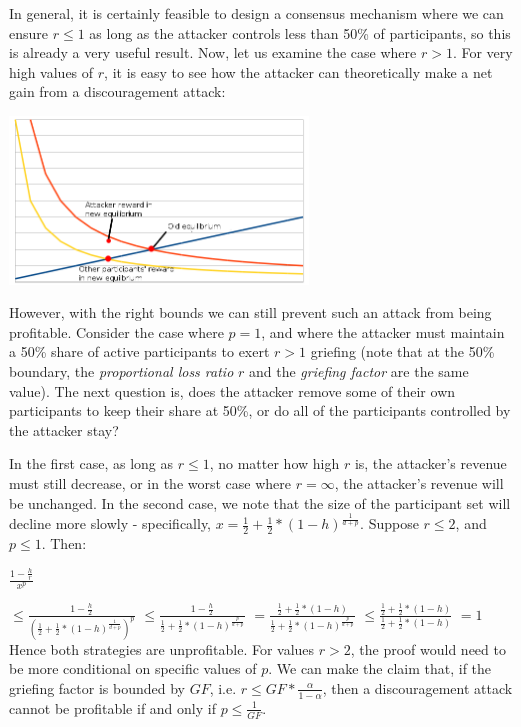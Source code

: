 \documentclass[12pt]{article}
\begin{document}
In general, it is certainly feasible to design a consensus mechanism where we can ensure $r \le 1$ as long as the attacker controls less than 50\% of participants, so this is already a very useful result. Now, let us examine the case where $r > 1$. For very high values of $r$, it is easy to see how the attacker can theoretically make a net gain from a discouragement attack:

\includegraphics[width=300px]{disc_chart3.png}



However, with the right bounds we can still prevent such an attack from being profitable. Consider the case where $p=1$, and where the attacker must maintain a 50\% share of active participants to exert $r > 1$ griefing (note that at the 50\% boundary, the \textit{proportional loss ratio} $r$ and the \textit{griefing factor} are the same value). The next question is, does the attacker remove some of their own participants to keep their share at 50\%, or do all of the participants controlled by the attacker stay?

In the first case, as long as $r \le 1$, no matter how high $r$ is, the attacker's revenue must still decrease, or in the worst case where $r = \infty$, the attacker's revenue will be unchanged. In the second case, we note that the size of the participant set will decline more slowly - specifically, $x = \frac{1}{2} + \frac{1}{2} * (1-h)^{\frac{1}{d+p}}$. Suppose $r \le 2$, and $p \le 1$. Then:

$\frac{1-\frac{h}{r}}{x^p}$


$ \le \frac{1-\frac{h}{2}}{(\frac{1}{2} + \frac{1}{2} * (1-h)^{\frac{1}{d+p}})^p}$
$ \le \frac{1-\frac{h}{2}}{\frac{1}{2} + \frac{1}{2} * (1-h)^{\frac{p}{d+p}}}$
$ = \frac{\frac{1}{2} + \frac{1}{2} * (1-h)}{\frac{1}{2} + \frac{1}{2} * (1-h)^{\frac{p}{d+p}}}$
$ \le \frac{\frac{1}{2} + \frac{1}{2} * (1-h)}{\frac{1}{2} + \frac{1}{2} * (1-h)}$
$ = 1$
Hence both strategies are unprofitable. For values $r > 2$, the proof would need to be more conditional on specific values of $p$. We can make the claim that, if the griefing factor is bounded by $GF$, i.e. $r \le GF * \frac{\alpha}{1-\alpha}$, then a discouragement attack cannot be profitable if and only if $p \le \frac{1}{GF}$.
\end{document}
